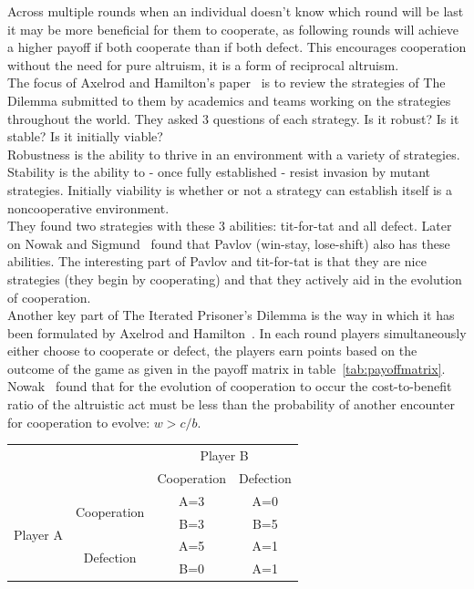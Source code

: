 \documentclass[]{final_report}
\begin{document}
Across multiple rounds when an individual doesn't know which round will be last it may be more beneficial for them to cooperate, as following rounds will achieve a higher payoff if both cooperate than if both defect. This encourages cooperation without the need for pure altruism, it is a form of reciprocal altruism.\\
The focus of Axelrod and Hamilton's paper~\cite{evolution_of_cooperation} is to review the strategies of The Dilemma submitted to them by academics and teams working on the strategies throughout the world. They asked 3 questions of each strategy. Is it robust? Is it stable? Is it initially viable?\\
Robustness is the ability to thrive in an environment with a variety of strategies. Stability is the ability to - once fully established - resist invasion by mutant strategies. Initially viability is whether or not a strategy can establish itself is a noncooperative environment.\\
They found two strategies with these 3 abilities: tit-for-tat and all defect. Later on Nowak and Sigmund~\cite{nowak-1993a} found that Pavlov (win-stay, lose-shift) also has these abilities. The interesting part of Pavlov and tit-for-tat is that they are nice strategies (they begin by cooperating) and that they actively aid in the evolution of cooperation.\\
Another key part of The Iterated Prisoner's Dilemma is the way in which it has been formulated by Axelrod and Hamilton~\cite{evolution_of_cooperation}. In each round players simultaneously either choose to cooperate or defect, the players earn points based on the outcome of the game as given in the payoff matrix in table~\ref{tab:payoffmatrix}. Nowak~\cite{five_rules_coop} found that for the evolution of cooperation to occur the cost-to-benefit ratio of the altruistic act must be less than the probability of another encounter for cooperation to evolve: $w>c/b$.\\
\begin{framed}
	\begin{center}
		\begin{tabular}{cc|c|c}
		& & \multicolumn{2}{c}{Player B}\\		
		& & Cooperation & Defection\\
		\cline{1-4}
		\multirow{4}{*}{Player A} &\multirow{2}{*}{Cooperation} & A=3 & A=0\\
		& & B=3 & B=5\\
		\cline{2-4}
		& \multirow{2}{*}{Defection} & A=5 & A=1\\
		& & B=0 & A=1\\
		\end{tabular}
		\label{tab:payoffmatrix}
	\end{center}	
\end{framed}
\end{document}
